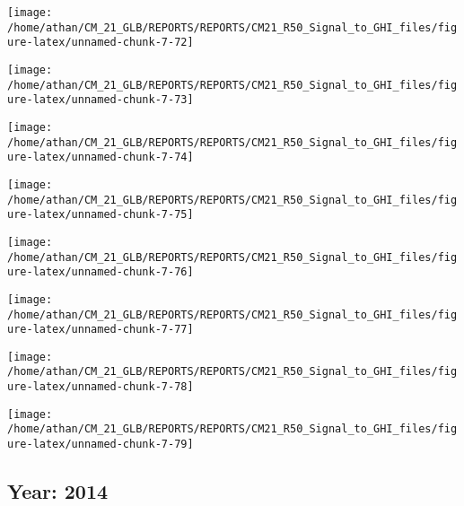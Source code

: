 \documentclass[
  11pt,
  a4paper,oneside]{article}
\begin{document}
\begin{center}\texttt{[image: /home/athan/CM\_21\_GLB/REPORTS/REPORTS/CM21\_R50\_Signal\_to\_GHI\_files/figure-latex/unnamed-chunk-7-72]} \end{center}

\begin{center}\texttt{[image: /home/athan/CM\_21\_GLB/REPORTS/REPORTS/CM21\_R50\_Signal\_to\_GHI\_files/figure-latex/unnamed-chunk-7-73]} \end{center}

\begin{center}\texttt{[image: /home/athan/CM\_21\_GLB/REPORTS/REPORTS/CM21\_R50\_Signal\_to\_GHI\_files/figure-latex/unnamed-chunk-7-74]} \end{center}

\begin{center}\texttt{[image: /home/athan/CM\_21\_GLB/REPORTS/REPORTS/CM21\_R50\_Signal\_to\_GHI\_files/figure-latex/unnamed-chunk-7-75]} \end{center}

\begin{center}\texttt{[image: /home/athan/CM\_21\_GLB/REPORTS/REPORTS/CM21\_R50\_Signal\_to\_GHI\_files/figure-latex/unnamed-chunk-7-76]} \end{center}

\begin{center}\texttt{[image: /home/athan/CM\_21\_GLB/REPORTS/REPORTS/CM21\_R50\_Signal\_to\_GHI\_files/figure-latex/unnamed-chunk-7-77]} \end{center}

\begin{center}\texttt{[image: /home/athan/CM\_21\_GLB/REPORTS/REPORTS/CM21\_R50\_Signal\_to\_GHI\_files/figure-latex/unnamed-chunk-7-78]} \end{center}

\begin{center}\texttt{[image: /home/athan/CM\_21\_GLB/REPORTS/REPORTS/CM21\_R50\_Signal\_to\_GHI\_files/figure-latex/unnamed-chunk-7-79]} \end{center}

\FloatBarrier

\newpage

\hypertarget{year-2014}{%
\subsection{Year: 2014}\label{year-2014}}
\end{document}
